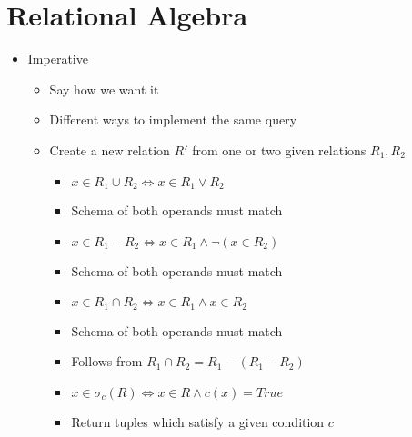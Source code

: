 
\section{Relational Algebra}
\begin{itemize}
    \item Imperative
        \begin{itemize}
            \item Say how we want it
            \item Different ways to implement the same query
        \end{itemize}
        \begin{itemize}
            \item Create a new relation $R'$ from one or two given relations $R_1, R_2$
                \begin{itemize}
                    \item $x \in R_1 \cup R_2 \iff x \in R_1 \lor R_2$
                    \item Schema of both operands must match
                \end{itemize}
                \begin{itemize}
                    \item $x \in R_1 - R_2 \iff x \in R_1 \land \neg (x \in R_2)$
                    \item Schema of both operands must match
                \end{itemize}
                \begin{itemize}
                    \item $x \in R_1 \cap R_2 \iff x \in R_1 \land x \in R_2$
                    \item Schema of both operands must match
                    \item Follows from $R_1 \cap R_2 = R_1 - (R_1 - R_2)$
                \end{itemize}
                \begin{itemize}
                    \item $x \in \sigma_c (R) \iff x \in R \land c(x) = True$
                    \item Return tuples which satisfy a given condition $c$
                \end{itemize}

\end{itemize}
\end{itemize}
